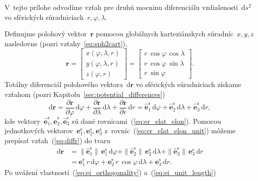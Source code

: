 \documentclass[a4paper, 12pt]{book}
\newcommand{\diff}{\mathrm d}
\let\vec\mathbf
\begin{document}
V~tejto prílohe odvodíme vzťah pre druhú mocninu diferenciálu 
vzdialenosti~$\diff s^2$ vo sférických súradniciach~$r, \varphi, \lambda$.

Definujme polohový vektor~$\vec r$ pomocou globálnych karteziánskych 
súradníc~$x, y, z$ nasledovne (pozri vzťahy~\ref{eq:sph2cart}),
%
\begin{equation}
\vec r =
%
\begin{bmatrix}
x(\varphi, \lambda, r)\\
y(\varphi, \lambda, r)\\
z(\varphi, r)
\end{bmatrix}
%
=
%
\begin{bmatrix}
r \, \cos\varphi \, \cos\lambda\\
r \, \cos\varphi \, \sin\lambda\\
r \, \sin\varphi
\end{bmatrix}
%
{.}
\end{equation}
%
Totálny diferenciál polohového vektora~$\diff \vec r$ vo sférických 
súradniciach získame vzťahom (pozri Kapitolu~\ref{sec:potential_differences})
%
\begin{equation}
\label{eq:diffr}
\diff \vec r = \frac{\partial \vec r}{\partial \varphi} \, \diff \varphi 
+ \frac{\partial \vec r}{\partial \lambda} \, \diff \lambda + \frac{\partial 
\vec r}{\partial r} \, \diff r = \hat{\vec e}_1^\mathrm{s} \, \diff \varphi 
+ \hat{\vec e}_2^\mathrm{s} \, \diff \lambda + \hat{\vec e}_3^\mathrm{s} \, 
\diff r{,}
\end{equation}
%
kde vektory~$\hat{\vec e}_1^\mathrm{s}, \hat{\vec e}_2^\mathrm{s}, \hat{\vec 
e}_3^\mathrm{s}$ sú dané rovnicami~(\ref{eq:er_elat_elon}).  Pomocou 
jednotkových vektorov~$\vec e_1^\mathrm{s}, \vec e_2^\mathrm{s}, \vec 
e_3^\mathrm{s}$ z~rovníc~(\ref{eq:er_elat_elon_unit}) môžeme prepísať 
vzťah~(\ref{eq:diffr}) do tvaru
%
\begin{equation}
\label{eq:diffr2}
\begin{split}
\diff \vec r &= \|\hat{\vec e}_1^\mathrm{s}\| \,\vec e_1^\mathrm{s} \, 
\diff\varphi + \|\hat{\vec e}_2^\mathrm{s}\| \, \vec e_2^\mathrm{s} \, 
\diff\lambda + \|\hat{\vec e}_3^\mathrm{s}\| \, \vec e_3^\mathrm{s} \, \diff 
r\\
%
&= \vec e_1^\mathrm{s} \, r \, \diff\varphi + \vec e_2^\mathrm{s} \, r \, 
\cos\varphi \, \diff\lambda + \vec e_3^\mathrm{s} \, \diff r{.}
\end{split}
\end{equation}
%
Po uvážení vlastností~(\ref{eq:ei_orthogonality}) a~(\ref{eq:ei_unit_length}) 
\end{document}
